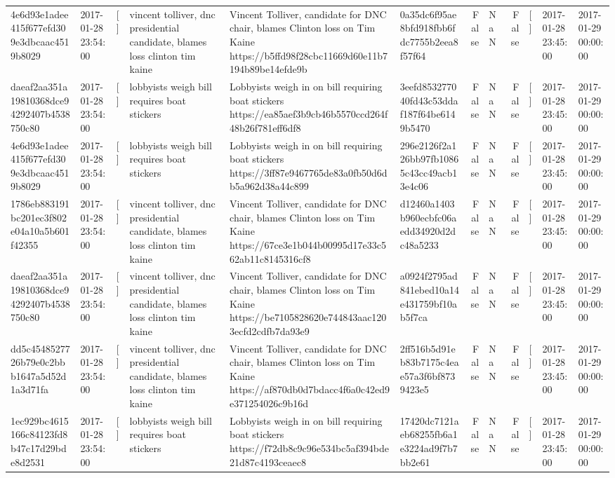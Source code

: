 \begin{tabular}{llllllrlrlll}
4e6d93e1adee415f677efd309e3dbcaac4519b8029 & 2017-01-28 23:54:00 & [] & vincent tolliver, dnc presidential candidate, blames loss clinton tim kaine & Vincent Tolliver, candidate for DNC chair, blames Clinton loss on Tim Kaine https://b5ffd98f28cbc11669d60e11b7194b89be14efde9b & 0a35dc6f95ae8bfd918fbb6fdc7755b2eea8f57f64 & False & NaN & False & [] & 2017-01-28 23:45:00 & 2017-01-29 00:00:00 \\
daeaf2aa351a19810368dce94292407b4538750c80 & 2017-01-28 23:54:00 & [] & lobbyists weigh bill requires boat stickers & Lobbyists weigh in on bill requiring boat stickers https://ea85aef3b9cb46b5570ccd264f48b26f781eff6df8 & 3eefd853277040fd43c53ddaf187f64be6149b5470 & False & NaN & False & [] & 2017-01-28 23:45:00 & 2017-01-29 00:00:00 \\
4e6d93e1adee415f677efd309e3dbcaac4519b8029 & 2017-01-28 23:54:00 & [] & lobbyists weigh bill requires boat stickers & Lobbyists weigh in on bill requiring boat stickers https://3ff87e9467765de83a0fb50d6db5a962d38a44c899 & 296e2126f2a126bb97fb10865c43cc49acb13e4c06 & False & NaN & False & [] & 2017-01-28 23:45:00 & 2017-01-29 00:00:00 \\
1786eb883191bc201ec3f802e04a10a5b601f42355 & 2017-01-28 23:54:00 & [] & vincent tolliver, dnc presidential candidate, blames loss clinton tim kaine & Vincent Tolliver, candidate for DNC chair, blames Clinton loss on Tim Kaine https://67ce3e1b044b00995d17e33c562ab11c8145316cf8 & d12460a1403b960ecbfc06aedd34920d2dc48a5233 & False & NaN & False & [] & 2017-01-28 23:45:00 & 2017-01-29 00:00:00 \\
daeaf2aa351a19810368dce94292407b4538750c80 & 2017-01-28 23:54:00 & [] & vincent tolliver, dnc presidential candidate, blames loss clinton tim kaine & Vincent Tolliver, candidate for DNC chair, blames Clinton loss on Tim Kaine https://be7105828620e744843aac1203ecfd2cdfb7da93e9 & a0924f2795ad841ebed10a14e431759bf10ab5f7ca & False & NaN & False & [] & 2017-01-28 23:45:00 & 2017-01-29 00:00:00 \\
dd5c4548527726b79e0c2bbb1647a5d52d1a3d71fa & 2017-01-28 23:54:00 & [] & vincent tolliver, dnc presidential candidate, blames loss clinton tim kaine & Vincent Tolliver, candidate for DNC chair, blames Clinton loss on Tim Kaine https://af870db0d7bdacc4f6a0c42ed9e371254026c9b16d & 2ff516b5d91eb83b7175c4eae57a3f6bf8739423e5 & False & NaN & False & [] & 2017-01-28 23:45:00 & 2017-01-29 00:00:00 \\
1ec929bc4615166c84123fd8b47c17d29bde8d2531 & 2017-01-28 23:54:00 & [] & lobbyists weigh bill requires boat stickers & Lobbyists weigh in on bill requiring boat stickers https://f72db8c9c96e534bc5af394bde21d87c4193ceaec8 & 17420dc7121aeb68255fb6a1e3224ad9f7b7bb2e61 & False & NaN & False & [] & 2017-01-28 23:45:00 & 2017-01-29 00:00:00 \\

\end{tabular}
